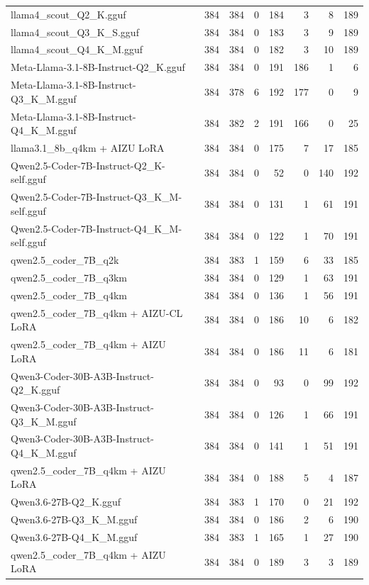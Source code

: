 \begin{table}[htbp]
{\begin{tabular}{lrrrrrrr}
    llama4\_scout\_Q2\_K.gguf & 384 & 384 & 0 & 184 & 3 & 8 & 189 \\
    llama4\_scout\_Q3\_K\_S.gguf & 384 & 384 & 0 & 183 & 3 & 9 & 189 \\
    llama4\_scout\_Q4\_K\_M.gguf & 384 & 384 & 0 & 182 & 3 & 10 & 189 \\
    Meta-Llama-3.1-8B-Instruct-Q2\_K.gguf & 384 & 384 & 0 & 191 & 186 & 1 & 6 \\
    Meta-Llama-3.1-8B-Instruct-Q3\_K\_M.gguf & 384 & 378 & 6 & 192 & 177 & 0 & 9 \\
    Meta-Llama-3.1-8B-Instruct-Q4\_K\_M.gguf & 384 & 382 & 2 & 191 & 166 & 0 & 25 \\
    llama3.1\_8b\_q4km + AIZU LoRA & 384 & 384 & 0 & 175 & 7 & 17 & 185 \\
    Qwen2.5-Coder-7B-Instruct-Q2\_K-self.gguf & 384 & 384 & 0 & 52 & 0 & 140 & 192 \\
    Qwen2.5-Coder-7B-Instruct-Q3\_K\_M-self.gguf & 384 & 384 & 0 & 131 & 1 & 61 & 191 \\
    Qwen2.5-Coder-7B-Instruct-Q4\_K\_M-self.gguf & 384 & 384 & 0 & 122 & 1 & 70 & 191 \\
    qwen2.5\_coder\_7B\_q2k & 384 & 383 & 1 & 159 & 6 & 33 & 185 \\
    qwen2.5\_coder\_7B\_q3km & 384 & 384 & 0 & 129 & 1 & 63 & 191 \\
    qwen2.5\_coder\_7B\_q4km & 384 & 384 & 0 & 136 & 1 & 56 & 191 \\
    qwen2.5\_coder\_7B\_q4km + AIZU-CL LoRA & 384 & 384 & 0 & 186 & 10 & 6 & 182 \\
    qwen2.5\_coder\_7B\_q4km + AIZU LoRA & 384 & 384 & 0 & 186 & 11 & 6 & 181 \\
    Qwen3-Coder-30B-A3B-Instruct-Q2\_K.gguf & 384 & 384 & 0 & 93 & 0 & 99 & 192 \\
    Qwen3-Coder-30B-A3B-Instruct-Q3\_K\_M.gguf & 384 & 384 & 0 & 126 & 1 & 66 & 191 \\
    Qwen3-Coder-30B-A3B-Instruct-Q4\_K\_M.gguf & 384 & 384 & 0 & 141 & 1 & 51 & 191 \\
    qwen2.5\_coder\_7B\_q4km + AIZU LoRA & 384 & 384 & 0 & 188 & 5 & 4 & 187 \\
    Qwen3.6-27B-Q2\_K.gguf & 384 & 383 & 1 & 170 & 0 & 21 & 192 \\
    Qwen3.6-27B-Q3\_K\_M.gguf & 384 & 384 & 0 & 186 & 2 & 6 & 190 \\
    Qwen3.6-27B-Q4\_K\_M.gguf & 384 & 383 & 1 & 165 & 1 & 27 & 190 \\
    qwen2.5\_coder\_7B\_q4km + AIZU LoRA & 384 & 384 & 0 & 189 & 3 & 3 & 189 \\

\end{tabular}}
\end{table}
